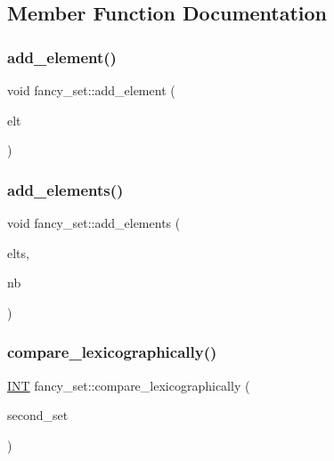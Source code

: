 \subsection{Member Function Documentation}
\mbox{\label{classfancy__set_ab3f7e0bf35d0c312db44973eaad5b085}} 
\subsubsection{\texorpdfstring{add\+\_\+element()}{add\_element()}}
{\footnotesize\ttfamily void fancy\+\_\+set\+::add\+\_\+element (\begin{DoxyParamCaption}\item[{\mbox{\hyperlink{galois_8h_a09fddde158a3a20bd2dcadb609de11dc}{I\+NT}}}]{elt }\end{DoxyParamCaption})}

\mbox{\label{classfancy__set_a624a559634418acd3818f0a24f1ee404}} 
\subsubsection{\texorpdfstring{add\+\_\+elements()}{add\_elements()}}
{\footnotesize\ttfamily void fancy\+\_\+set\+::add\+\_\+elements (\begin{DoxyParamCaption}\item[{\mbox{\hyperlink{galois_8h_a09fddde158a3a20bd2dcadb609de11dc}{I\+NT}} $\ast$}]{elts,  }\item[{\mbox{\hyperlink{galois_8h_a09fddde158a3a20bd2dcadb609de11dc}{I\+NT}}}]{nb }\end{DoxyParamCaption})}

\mbox{\label{classfancy__set_ad4de00945e560a432a3d5c88ede380eb}} 
\subsubsection{\texorpdfstring{compare\+\_\+lexicographically()}{compare\_lexicographically()}}
{\footnotesize\ttfamily \mbox{\hyperlink{galois_8h_a09fddde158a3a20bd2dcadb609de11dc}{I\+NT}} fancy\+\_\+set\+::compare\+\_\+lexicographically (\begin{DoxyParamCaption}\item[{\mbox{\hyperlink{classfancy__set}{fancy\+\_\+set}} $\ast$}]{second\+\_\+set }\end{DoxyParamCaption})}

